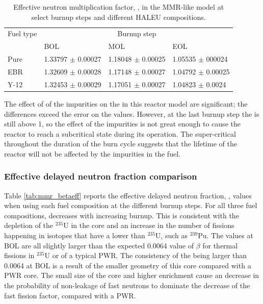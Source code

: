 \begin{table}[h!]
        \centering
        \caption{Effective neutron multiplication 
        factor, \keff, in the \gls*{MMR}-like model at select burnup 
        steps and different \gls*{HALEU} compositions.}
        \label{tab:mmr_keff}
        \begin{tabular}{l l l l}
                \hline 
                Fuel type & \multicolumn{3}{c}{Burnup step}\\
                & \gls*{BOL} & \gls*{MOL} & \gls*{EOL} \\
                \hline 
                Pure & 1.33797 $\pm$ 0.00027 & 1.18048 $\pm$ 0.00025 & 1.05535 $\pm$ 000024\\
                \gls*{EBR} & 1.32609 $\pm$ 0.00028 & 1.17148 $\pm$ 0.00027 & 1.04792 $\pm$ 0.00025 \\
                Y-12 & 1.32453 $\pm$ 0.00029 & 1.17051 $\pm$ 0.00027 & 1.04823 $\pm$ 0.0024\\
                \hline
                
        \end{tabular}
\end{table}

The effect of of the impurities on the \keff in this reactor 
model are significant; the differences exceed the error on the values. However, 
at the last burnup step the \keff is still above 1, so the 
effect of the impurities 
is not great enough to cause the reactor to reach a subcritical state 
during its operation. The super-critical \keff throughout the duration 
of the burn cycle suggests that the lifetime of the reactor will not be 
affected by the impurities in the fuel.

\subsubsection{Effective delayed neutron fraction comparison}
Table \ref{tab:mmr_betaeff} reports the effective delayed 
neutron fraction, \betaEff, values when using 
each fuel composition at the different burnup steps. For all three 
fuel compositions, \betaEff decreases with increasing burnup. This 
is consistent with the depletion of the $^{235}$U in the core and 
an increase in the number of fissions happening in isotopes
that have a lower \betaEff than $^{235}$U, such as $^{239}$Pu. 
The \betaEff values at \gls*{BOL} are all slightly larger 
than the expected 0.0064 value of $\beta$ for thermal fissions in $^{235}$U
or \betaEff of a typical \gls*{PWR}. The consistency of the 
\betaEff being
larger than 0.0064 at \gls*{BOL} 
is a result of the smaller geometry of this core compared with a 
\gls*{PWR} core.
The small size of the core and higher enrichment cause an 
decrease in the probability of non-leakage of fast neutrons to 
dominate the decrease of the fast fission factor, compared with a \gls*{PWR}. 


